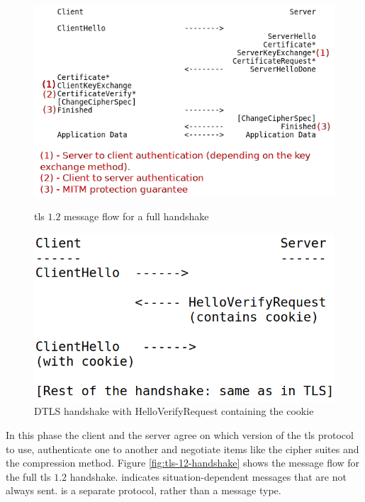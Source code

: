 \documentclass{llncs}
\begin{document}
\begin{figure}
    \centering
    \begin{minipage}{0.6\textwidth}
        \centering
        \includegraphics[width=1.0\textwidth]{img/tls-12-full-handshake2.png} %
        \caption{\label{fig:tls-12-handshake} \gls{tls} $1.2$ message flow for a full handshake}
    \end{minipage}\hfill
    \begin{minipage}{0.4\textwidth}
        \centering
        \includegraphics[width=1.0\textwidth]{img/dtls-cookie.png} %
        \caption{\label{fig:dtls-cookie} DTLS handshake with HelloVerifyRequest containing the cookie}
    \end{minipage}
\end{figure}


In this phase the client and the server agree on which version of the \gls{tls}
protocol to use, authenticate one to another and negotiate items like
the cipher suites and the compression method. Figure \ref{fig:tls-12-handshake} shows the message flow for the
full \gls{tls} $1.2$ handshake. \codeword{*} indicates situation-dependent
messages that are not always sent.  is a separate
protocol, rather than a message type.
\end{document}
